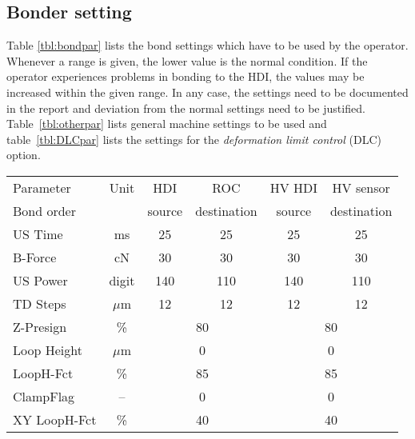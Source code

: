\documentclass[12pt]{unlsilabsop}
\begin{document}
\subsection{Bonder setting}

Table \ref{tbl:bondpar} lists the bond settings which have to be used by the operator. Whenever a range is given, the lower value is the normal condition. If the operator experiences problems in bonding to the HDI, the values may be increased within the given range. In any case, the settings need to be documented in the report and deviation from the normal settings need to be justified. Table~\ref{tbl:otherpar} lists general machine settings to be used and table~\ref{tbl:DLCpar} lists the settings for the \emph{deformation limit control} (DLC) option.

\begin{table*}[hH]
\begin{center}
\caption{Bond parameter settings for bonds from HDI to ROC and HDI to sensor HV pad. Ranges denote allowed parameter boundaries at the discretion of the operator to adjust for quality variations of the HDI.}
\label{tbl:bondpar}

\bigskip

\begin{tabular}{lc|cc|cc}
\toprule
Parameter & Unit & HDI & ROC & HV HDI & HV sensor \\
\multicolumn{2}{l|}{Bond order} & source & destination & source & destination \\
    \midrule
US Time      &  ms    &  25 &  25 &  25 &  25 \\
B-Force      &  cN    &  30 &  30 &  30 &  30 \\
US Power     & digit  & 140 & 110 & 140 & 110 \\
TD Steps     & $\mu$m &  12 &  12 &  12 &  12 \\
    \midrule
Z-Presign    & \%     & \multicolumn{2}{|c|}{80} & \multicolumn{2}{|c}{80} \\
Loop Height  & $\mu$m & \multicolumn{2}{|c|}{0 } & \multicolumn{2}{|c}{0 } \\
LoopH-Fct    & \%     & \multicolumn{2}{|c|}{85} & \multicolumn{2}{|c}{85} \\
ClampFlag    & --     & \multicolumn{2}{|c|}{0 } & \multicolumn{2}{|c}{0 } \\
XY LoopH-Fct & \%     & \multicolumn{2}{|c|}{40} & \multicolumn{2}{|c}{40} \\
   \bottomrule
\end{tabular}
\end{center}
\end{table*}
\end{document}
